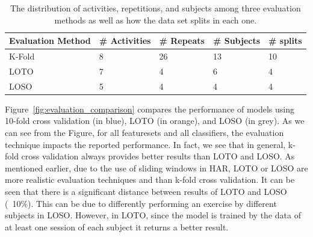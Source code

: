 \documentclass[journal,article,submit,moreauthors,pdftex]{Definitions/mdpi}
\begin{document}
\begin{table}[H]
	\caption{The distribution of activities, repetitions, and subjects among three evaluation methods as well as how the data set splits in each one. }
	\centering
	\begin{tabular}{p{4cm}p{2.2cm}p{2.2cm}p{2.2cm}p{2.2cm}}
		\toprule
		\textbf{Evaluation Method} & \textbf{\# Activities} & \textbf{\# Repeats}  & \textbf{\# Subjects}& \textbf{\# splits}\\
		\midrule
		K-Fold &  8 & 26 & 13 & 10 \\
		LOTO & 7 & 4& 6& 4  \\
		LOSO & 5 & 4 & 4& 4  \\
		\bottomrule
	\end{tabular}
	\label{dataset_destribution}
\end{table}
Figure~\ref{fig:evaluation_comparison} compares the performance of models using 10-fold cross validation (in blue), LOTO (in orange), and LOSO (in grey). As we can see from the Figure, for all featuresets and all classifiers, the evaluation technique impacts the reported performance. In fact, we see that in general, k-fold cross validation always provides better results than LOTO and LOSO. As mentioned earlier, due to the use of sliding windows in HAR, LOTO or LOSO are more realistic evaluation techniques and than k-fold cross validation. It can be seen that there is a significant distance between results of LOTO and LOSO (~10\%). This can be due to differently performing an exercise by different subjects in LOSO. However, in LOTO, since the model is trained by the data of at least one session of each subject it returns a better result. 

\end{document}
